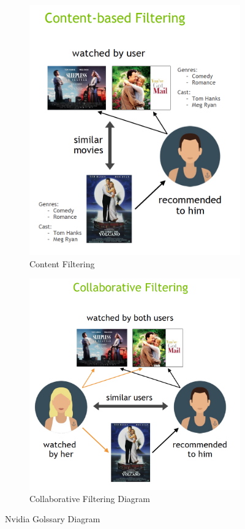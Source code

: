 \begin{figure}[H]
    \centering
    \begin{subfigure}{.5\textwidth}
        \centering
        \includegraphics[width=0.8\linewidth]{assets/content_based_filtering.png}
        \caption{Content Filtering}
        \label{fig:content-filtering}
    \end{subfigure}%
    \begin{subfigure}{.5\textwidth}
        \centering
        \includegraphics[width=0.95\linewidth]{assets/collaborative_filtering.png}
        \caption{Collaborative Filtering Diagram}
        \label{fig:collaborative-filtering}
        
    \end{subfigure}
    \caption{Nvidia Golssary Diagram\cite{NvidiaRecSys}}
\end{figure}


